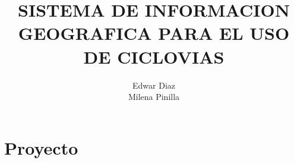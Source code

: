 \documentclass[11pt]{book}
\title{SISTEMA DE INFORMACION GEOGRAFICA PARA EL USO DE CICLOVIAS}
\author{Edwar Diaz \\ Milena Pinilla}
\begin{document}
	\maketitle
	\tableofcontents
\part{Proyecto}

\end{document}
